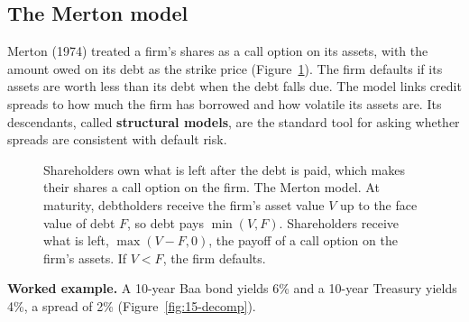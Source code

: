 \subsection{The Merton model}

Merton (1974) treated a firm's shares as a call option on its assets, with the amount owed on its debt as the strike price (Figure~\ref{fig:15-merton}). The firm defaults if its assets are worth less than its debt when the debt falls due. The model links credit spreads to how much the firm has borrowed and how volatile its assets are. Its descendants, called \textbf{structural models}, are the standard tool for asking whether spreads are consistent with default risk.

\begin{figure}[htbp]
\centering
{}
\caption{Shareholders own what is left after the debt is paid, which makes their shares a call option on the firm. The Merton model. At maturity, debtholders receive the firm's asset value $V$ up to the face value of debt $F$, so debt pays $\min(V, F)$. Shareholders receive what is left, $\max(V - F, 0)$, the payoff of a call option on the firm's assets. If $V < F$, the firm defaults.}
\label{fig:15-merton}
\end{figure}

\textbf{Worked example.} A 10-year Baa bond yields 6\% and a 10-year Treasury yields 4\%, a spread of 2\% (Figure~\ref{fig:15-decomp}).

